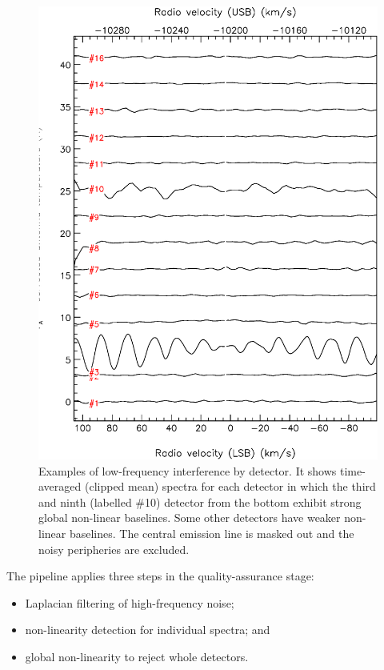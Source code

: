 \documentclass[final,authoryear,5p,times,twocolumn]{elsarticle}
\begin{document}
\begin{figure}[t]
\includegraphics[width=\columnwidth]{receptors_nonlinearity}
\caption{Examples of low-frequency interference by detector.
  It shows time-averaged (clipped mean) spectra for each detector in
  which the third and ninth (labelled \#10) detector from the bottom
  exhibit strong global non-linear baselines.  Some other detectors
  have weaker non-linear baselines.  The central emission line
  is masked out and the noisy peripheries are excluded.}
\label{fig:badbase:interference_receptors}
\end{figure}

The pipeline applies three steps in the quality-assurance stage:
\begin{itemize}
\item Laplacian filtering of high-frequency noise;
\item non-linearity detection for individual spectra; and
\item global non-linearity to reject whole detectors.
\end{itemize}
\end{document}
